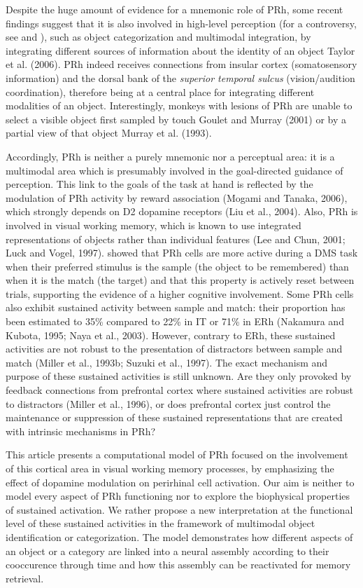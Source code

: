 \documentclass[
  11pt,
  a4paper,
]{scrbook}
\begin{document}
Despite the huge amount of evidence for a mnemonic role of PRh, some
recent findings suggest that it is also involved in high-level
perception (for a controversy, see and ), such as object categorization
and multimodal integration, by integrating different sources of
information about the identity of an object Taylor et al. (2006). PRh
indeed receives connections from insular cortex (somatosensory
information) and the dorsal bank of the \emph{superior temporal sulcus}
(vision/audition coordination), therefore being at a central place for
integrating different modalities of an object. Interestingly, monkeys
with lesions of PRh are unable to select a visible object first sampled
by touch Goulet and Murray (2001) or by a partial view of that object
Murray et al. (1993).

Accordingly, PRh is neither a purely mnemonic nor a perceptual area: it
is a multimodal area which is presumably involved in the goal-directed
guidance of perception. This link to the goals of the task at hand is
reflected by the modulation of PRh activity by reward association
(Mogami and Tanaka, 2006), which strongly depends on D2 dopamine
receptors (Liu et al., 2004). Also, PRh is involved in visual working
memory, which is known to use integrated representations of objects
rather than individual features (Lee and Chun, 2001; Luck and Vogel,
1997). showed that PRh cells are more active during a DMS task when
their preferred stimulus is the sample (the object to be remembered)
than when it is the match (the target) and that this property is
actively reset between trials, supporting the evidence of a higher
cognitive involvement. Some PRh cells also exhibit sustained activity
between sample and match: their proportion has been estimated to 35\%
compared to 22\% in IT or 71\% in ERh (Nakamura and Kubota, 1995; Naya
et al., 2003). However, contrary to ERh, these sustained activities are
not robust to the presentation of distractors between sample and match
(Miller et al., 1993b; Suzuki et al., 1997). The exact mechanism and
purpose of these sustained activities is still unknown. Are they only
provoked by feedback connections from prefrontal cortex where sustained
activities are robust to distractors (Miller et al., 1996), or does
prefrontal cortex just control the maintenance or suppression of these
sustained representations that are created with intrinsic mechanisms in
PRh?

This article presents a computational model of PRh focused on the
involvement of this cortical area in visual working memory processes, by
emphasizing the effect of dopamine modulation on perirhinal cell
activation. Our aim is neither to model every aspect of PRh functioning
nor to explore the biophysical properties of sustained activation. We
rather propose a new interpretation at the functional level of these
sustained activities in the framework of multimodal object
identification or categorization. The model demonstrates how different
aspects of an object or a category are linked into a neural assembly
according to their cooccurence through time and how this assembly can be
reactivated for memory retrieval.
\end{document}
